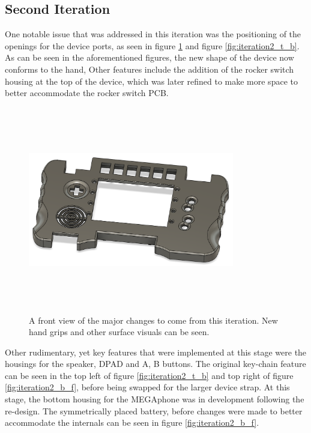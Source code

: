 \subsection{Second Iteration}

One notable issue that was addressed in this iteration was the positioning of the openings for the device ports, as seen in figure \ref{fig:iteration2_t_f} and figure \ref{fig:iteration2_t_b}.
As can be seen in the aforementioned figures, the new shape of the device now conforms to the hand,
Other features include the addition of the rocker switch housing at the top of the device, which was later refined to make more space to better accommodate the rocker switch PCB.

\begin{figure} [h]
    \centering
    \includegraphics[width=9cm,height=9cm,keepaspectratio]{Figures/iteration2_top_front.png}
    \caption{A front view of the major changes to come from this iteration. New hand grips and other surface visuals can be seen.}
    \label{fig:iteration2_t_f}
\end{figure}

Other rudimentary, yet key features that were implemented at this stage were the housings for the speaker, DPAD and A, B buttons.
The original key-chain feature can be seen in the top left of figure \ref{fig:iteration2_t_b} and top right of figure \ref{fig:iteration2_b_f}, before being swapped for the larger device strap.
At this stage, the bottom housing for the MEGAphone was in development following the re-design.
The symmetrically placed battery, before changes were made to better accommodate the internals can be seen in figure \ref{fig:iteration2_b_f}.

